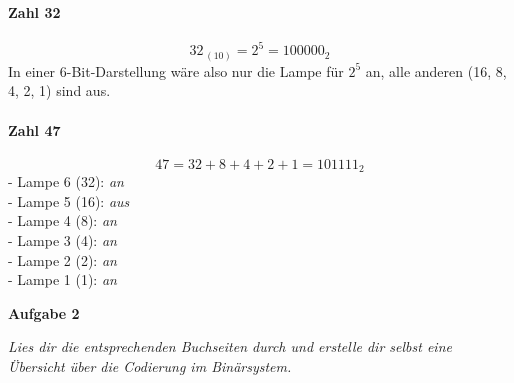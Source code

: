\documentclass[a4paper,12pt]{article}
\begin{document}
                                              \paragraph{Zahl 32}
                                              \[
                                                32_{\,(10)} = 2^5 = 100000_2
                                                \]
                                                In einer 6-Bit-Darstellung wäre also nur die Lampe für \(2^5\) an, alle anderen (16, 8, 4, 2, 1) sind aus.

                                                \paragraph{Zahl 47}
                                                \[
                                                  47 = 32 + 8 + 4 + 2 + 1 = 101111_2
                                                  \]
                                                  - Lampe 6 (32): \emph{an} \\
                                                  - Lampe 5 (16): \emph{aus} \\
                                                  - Lampe 4 (8): \emph{an} \\
                                                  - Lampe 3 (4): \emph{an} \\
                                                  - Lampe 2 (2): \emph{an} \\
                                                  - Lampe 1 (1): \emph{an}

                                                  \bigskip

                                                  \textbf{Aufgabe 2}

                                                  \emph{Lies dir die entsprechenden Buchseiten durch und erstelle dir selbst eine Übersicht über die Codierung im Binärsystem.}
\end{document}
